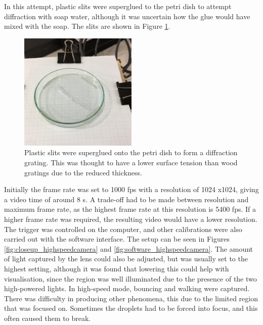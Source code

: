 In this attempt, plastic slits were superglued to the petri dish to attempt diffraction with soap water, although it was uncertain how the glue would have mixed with the soap. The slits are shown in Figure \ref{fig:plastic_slits}.

\begin{figure}[htb]
\includegraphics[width=0.5\textwidth]{prototype/exp_rep_imgs/plastic_slits.jpg}
\centering
\caption{Plastic slits were superglued onto the petri dish to form a diffraction grating. This was thought to have a lower surface tension than wood gratings due to the reduced thickness.}
\centering
\label{fig:plastic_slits}
\end{figure}

Initially the frame rate was set to 1000 fps with a resolution of 1024 x1024, giving a video time of around 8 s. A trade-off had to be made between resolution and maximum frame rate, as the highest frame rate at this resolution is 5400 fps. If a higher frame rate was required, the resulting video would have a lower resolution. The trigger was controlled on the computer, and other calibrations were also carried out with the software interface. The setup can be seen in Figures \ref{fig:closeup_highspeedcamera} and \ref{fig:software_highspeedcamera}. The amount of light captured by the lens could also be adjusted, but was usually set to the highest setting, although it was found that lowering this could help with visualisation, since the region was well illuminated due to the presence of the two high-powered lights. In high-speed mode, bouncing and walking were captured. There was difficulty in producing other phenomena, this due to the limited region that was focused on. Sometimes the droplets had to be forced into focus, and this often caused them to break.

